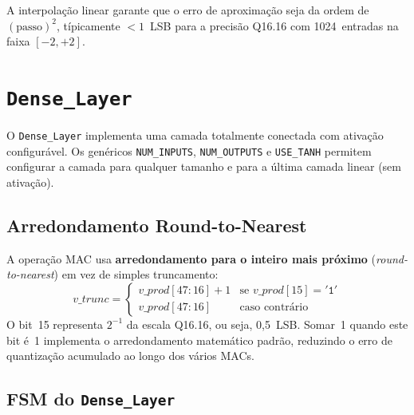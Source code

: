 \documentclass[a4paper,12pt]{article}
\begin{document}
A interpola\c{c}\~ao linear garante que o erro de aproxima\c{c}\~ao seja da ordem de $(\text{passo})^2$, t\'ipicamente $<1$~LSB para a precis\~ao Q16.16 com 1024~entradas na faixa $[-2, +2]$.


\section{\texttt{Dense\_Layer}}

O \texttt{Dense\_Layer} implementa uma camada totalmente conectada com ativa\c{c}\~ao configur\'avel. Os gen\'ericos \texttt{NUM\_INPUTS}, \texttt{NUM\_OUTPUTS} e \texttt{USE\_TANH} permitem configurar a camada para qualquer tamanho e para a \'ultima camada linear (sem ativa\c{c}\~ao).

\subsection{Arredondamento Round-to-Nearest}

A opera\c{c}\~ao MAC usa \textbf{arredondamento para o inteiro mais pr\'oximo} (\textit{round-to-nearest}) em vez de simples truncamento:
\[
    v\_trunc = \begin{cases}
        v\_prod[47\!:\!16] + 1 & \text{se } v\_prod[15] = \mathtt{'1'} \\
        v\_prod[47\!:\!16]     & \text{caso contr\'ario}
    \end{cases}
\]
O bit~15 representa $2^{-1}$ da escala Q16.16, ou seja, 0,5~LSB. Somar~1 quando este bit \'e~1 implementa o arredondamento matem\'atico padr\~ao, reduzindo o erro de quantiza\c{c}\~ao acumulado ao longo dos v\'arios MACs.

\subsection{FSM do \texttt{Dense\_Layer}}
\end{document}
